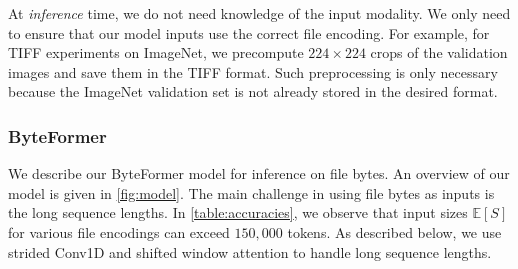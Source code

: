 At \textit{inference} time, we do not need knowledge of the input modality. We only need to ensure that our model inputs use the correct file encoding. For example, for TIFF experiments on ImageNet, we precompute $224\times 224$ crops of the validation images and save them in the TIFF format. Such preprocessing is only necessary because the ImageNet validation set is not already stored in the desired format.

\begin{table}[]
    \centering
    \caption{ImageNet Top-1 accuracy of ByteFormer Tiny (BF-Ti) using various file encodings, compared to DeiT-Ti. $\mathbb{E}[S]$ denotes the input shape, and $\mathbb{E}[L_t]$ denotes the token length passed to the transformer backbone. ($^\star$) denotes our implementation of DeiT-Ti. We set BF-Ti's Conv1D kernel size to $k=32$ for all experiments except JPEG ($k=8$).}
    \label{table:accuracies}
\end{table}

\subsubsection{ByteFormer}
We describe our ByteFormer model for inference on file bytes. An overview of our model is given in \autoref{fig:model}. The main challenge in using file bytes as inputs is the long sequence lengths. In \autoref{table:accuracies}, we observe that input sizes $\mathbb{E}[S]$ for various file encodings can exceed $150,000$ tokens. As described below, we use strided Conv1D and shifted window attention \cite{swintransformer} to handle long sequence lengths.

